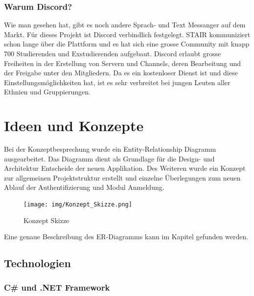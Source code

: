 \documentclass[a4paper, table]{article}
\begin{document}
\subsubsection*{Warum Discord?}
Wie man gesehen hat, gibt es noch andere Sprach- und Text Messanger auf dem Markt.
Für dieses Projekt ist Discord verbindlich festgelegt.
STAIR kommuniziert schon lange über die Plattform und es hat sich eine grosse Community mit knapp 700 Studierenden und Exstudierenden aufgebaut.
Discord erlaubt grosse Freiheiten in der Erstellung von Servern und Channels, deren Bearbeitung und der Freigabe unter den Mitgliedern.
Da es ein kostenloser Dienst ist und diese Einstellungsmöglichkeiten hat, ist es sehr verbreitet bei jungen Leuten aller Ethnien und Gruppierungen.

\newpage
\section{Ideen und Konzepte}

Bei der Konzeptbesprechung wurde ein Entity-Relationship Diagramm ausgearbeitet.
Das Diagramm dient als Grundlage für die Design- und Architektur Entscheide der neuen Applikation.
Des Weiteren wurde ein Konzept zur allgemeinen Projektstruktur erstellt und einzelne Überlegungen zum neuen Ablauf der Authentifizierung und Modul Anmeldung.

\begin{figure}[h]
    \centering
    \texttt{[image: img/Konzept\_Skizze.png]}
    \caption{Konzept Skizze}
    \label{fig:concept-sketch}
\end{figure}

Eine genaue Beschreibung des ER-Diagramms kann im Kapitel  gefunden werden.

\subsection{Technologien}

\subsubsection{C\# und .NET Framework}
\end{document}
